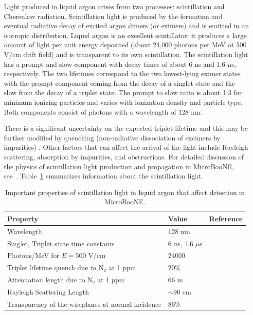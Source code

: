 Light produced in liquid argon arises from two processes: scintillation and Cherenkov radiation.  
Scintillation light is produced by the formation and eventual radiative decay of excited argon dimers (or eximers) and is emitted in an isotropic distribution.  Liquid argon is an excellent scintillator: it produces a large amount of light per unit energy deposited (about 24,000 photons per MeV at 500 V/cm drift field) and is transparent to its own scintillation. %
The scintillation light has a prompt and slow component with decay times of about 6 ns and 1.6 $\mu$s, respectively. The two lifetimes correspond to the two lowest-lying eximer states with the prompt component coming from the decay of a singlet state and the slow from the decay of a triplet state.  The prompt to slow ratio is about 1:3 for minimum ionizing particles and varies with ionization density and particle type. Both components consist of photons with a wavelength of 128 nm.

There is a significant uncertainty on the expected triplet lifetime \cite{PhysRevB.27.5279} and this may be further modified by quenching (non-radiative dissociation of excimers by impurities)  \cite{Acciarri:2008kv}.  Other factors that can affect the arrival of the light include Rayleigh scattering, absorption by impurities, and obstructions.  For detailed discussion of the physics of scintillation light production and propagation in MicroBooNE, see~\cite{Jones:2015bya}. Table~\ref{tab:lightparam} summarizes information about the scintillation light.  

\begin{table}
   \centering
    \caption{Important properties of scintillation light in liquid argon that affect detection in MicroBooNE.} 
    \begin{tabular}{llr} %
    \hline
    Property & Value & Reference\\
    \hline
    Wavelength & 128 nm & \cite{SUZUKI1979197}\\
    Singlet, Triplet state time constants & 6 ns, 1.6 $\mu$s &\cite{PhysRevB.27.5279} \\
    Photons/MeV for $E=500$ V/cm & 24000 & \cite{Amerio:2004-T600}\\
     Triplet lifetime quench due to N$_2$ at 1 ppm  & 20$\%$ & \cite{Acciarri:2008kv} \\
     Attenuation length due to N$_2$ at 1 ppm & 66 m &\cite{Jones:2013bca} \\
     Rayleigh Scattering Length & $\sim$90 cm &\cite{1997NIMPA.384..380I} \\
     Transparency of the wireplanes at normal incidence & 86$\%$ & -\\
    \hline
   \end{tabular}
   \label{tab:lightparam}
\end{table} 


